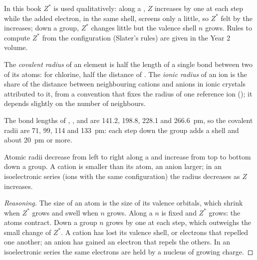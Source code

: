 \begin{remark}\label{rem:b1:periodicity:slater}
In this book $Z^{*}$ is used qualitatively: along a , $Z$
increases by one at each step while the added electron, in the same
shell, screens only a little, so $Z^{*}$ felt by the 
increases; down a group, $Z^{*}$ changes little but the valence shell
$n$ grows. Rules to compute $Z^{*}$ from the configuration (Slater's
rules) are given in the Year 2 volume.
\end{remark}

\begin{definition}\label{def:b1:periodicity:radius}
The \emph{covalent radius} of an element is half
the length of a single bond between two of its atoms: for chlorine, half
the  distance of . The \emph{ionic
radius} of an ion is the share of the distance
between neighbouring cations and anions in ionic crystals attributed to
it, from a convention that fixes the radius of one reference ion
(); it depends slightly on the number of neighbours.
\end{definition}

\begin{example}\label{ex:b1:periodicity:halogen-radii}
The bond lengths of , ,  and  are 141.2,
198.8, 228.1 and \qty{266.6}{pm}, so the covalent radii are 71, 99, 114
and \qty{133}{pm}: each step down the group adds a shell and about
\qty{20}{pm} or more.
\end{example}

\begin{proposition}\label{prop:b1:periodicity:radius-trend}
Atomic radii decrease from left to right along a  and increase
from top to bottom down a group. A cation is smaller than its atom, an
anion larger; in an isoelectronic series (ions with the same
configuration) the radius decreases as $Z$ increases.
\end{proposition}

\begin{proof}[Reasoning]
The size of an atom is the size of its valence orbitals, which shrink
when $Z^{*}$ grows and swell when $n$ grows. Along a  $n$ is fixed
and $Z^{*}$ grows: the atoms contract. Down a group $n$ grows by one at
each step, which outweighs the small change of $Z^{*}$. A cation has lost
its valence shell, or electrons that repelled one another; an anion has
gained an electron that repels the others. In an isoelectronic series
the same electrons are held by a nucleus of growing charge.
\end{proof}

